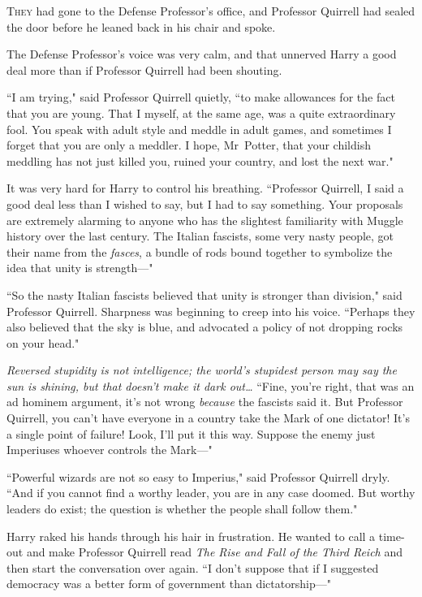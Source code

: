 
\lettrine{T}{hey} had gone to the Defense Professor's office, and Professor Quirrell had sealed the door before he leaned back in his chair and spoke.

The Defense Professor's voice was very calm, and that unnerved Harry a good deal more than if Professor Quirrell had been shouting.

``I am trying," said Professor Quirrell quietly, ``to make allowances for the fact that you are young. That I myself, at the same age, was a quite extraordinary fool. You speak with adult style and meddle in adult games, and sometimes I forget that you are only a meddler. I hope, Mr~Potter, that your childish meddling has not just killed you, ruined your country, and lost the next war."

It was very hard for Harry to control his breathing. ``Professor Quirrell, I said a good deal less than I wished to say, but I had to say something. Your proposals are extremely alarming to anyone who has the slightest familiarity with Muggle history over the last century. The Italian fascists, some very nasty people, got their name from the \emph{fasces}, a bundle of rods bound together to symbolize the idea that unity is strength—"

``So the nasty Italian fascists believed that unity is stronger than division," said Professor Quirrell. Sharpness was beginning to creep into his voice. ``Perhaps they also believed that the sky is blue, and advocated a policy of not dropping rocks on your head."

\emph{Reversed stupidity is not intelligence; the world's stupidest person may say the sun is shining, but that doesn't make it dark out{\ldots}} ``Fine, you're right, that was an ad hominem argument, it's not wrong \emph{because} the fascists said it. But Professor Quirrell, you can't have everyone in a country take the Mark of one dictator! It's a single point of failure! Look, I'll put it this way. Suppose the enemy just Imperiuses whoever controls the Mark—"

``Powerful wizards are not so easy to Imperius," said Professor Quirrell dryly. ``And if you cannot find a worthy leader, you are in any case doomed. But worthy leaders do exist; the question is whether the people shall follow them."

Harry raked his hands through his hair in frustration. He wanted to call a time-out and make Professor Quirrell read \emph{The Rise and Fall of the Third Reich} and then start the conversation over again. ``I don't suppose that if I suggested democracy was a better form of government than dictatorship—"

